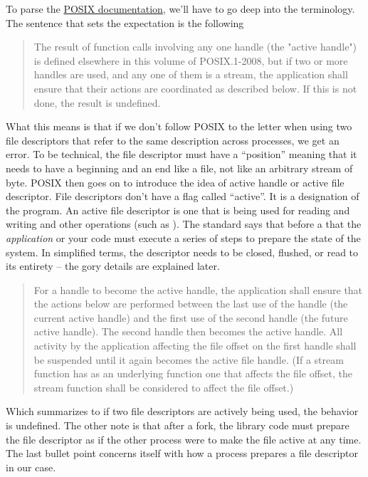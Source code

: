 To parse the \href{http://pubs.opengroup.org/onlinepubs/9699919799.2008edition/functions/V2_chap02.html}{POSIX documentation}, we'll have to go deep into the terminology.
The sentence that sets the expectation is the following

\begin{quote}
The result of function calls involving any one handle (the "active handle") is defined elsewhere in this volume of POSIX.1-2008, but if two or more handles are used, and any one of them is a stream, the application shall ensure that their actions are coordinated as described below. If this is not done, the result is undefined.
\end{quote}

What this means is that if we don't follow POSIX to the letter when using two file descriptors that refer to the same description across processes, we get an error.
To be technical, the file descriptor must have a ``position'' meaning that it needs to have a beginning and an end like a file, not like an arbitrary stream of byte.
POSIX then goes on to introduce the idea of active handle or active file descriptor.
File descriptors don't have a flag called ``active''.
It is a designation of the program.
An active file descriptor is one that is being used for reading and writing and other operations (such as ).
The standard says that before a  that the \textit{application} or your code must execute a series of steps to prepare the state of the system.
In simplified terms, the descriptor needs to be closed, flushed, or read to its entirety -- the gory details are explained later.

\begin{quote}
For a handle to become the active handle, the application shall ensure that the actions below are performed between the last use of the handle (the current active handle) and the first use of the second handle (the future active handle). The second handle then becomes the active handle. All activity by the application affecting the file offset on the first handle shall be suspended until it again becomes the active file handle. (If a stream function has as an underlying function one that affects the file offset, the stream function shall be considered to affect the file offset.)
\end{quote}

Which summarizes to if two file descriptors are actively being used, the behavior is undefined.
The other note is that after a fork, the library code must prepare the file descriptor as if the other process were to make the file active at any time.
The last bullet point concerns itself with how a process prepares a file descriptor in our case.

